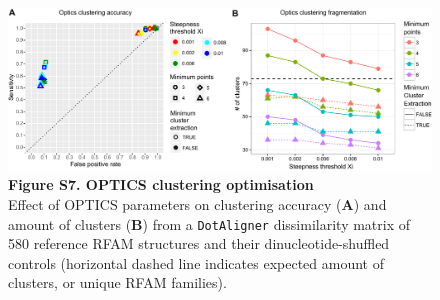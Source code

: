 \documentclass{bmcart}
\newcommand\dotaligner{\texttt{DotAligner}}
\begin{document}
\begin{figure}
 \includegraphics[width=\textwidth]{SF7}
 \caption*{ \textbf{ Figure S7. OPTICS clustering optimisation }\\
Effect of OPTICS parameters on clustering accuracy (\textbf{A}) and amount 
 of clusters (\textbf{B}) from a \dotaligner{} dissimilarity matrix of 580 reference RFAM 
 structures and their dinucleotide-shuffled controls (horizontal dashed line indicates 
 expected amount of clusters, or unique RFAM families). }
\end{figure}
\end{document}
